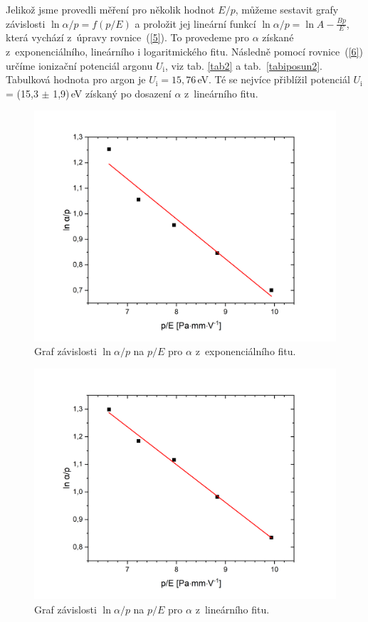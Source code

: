 \documentclass[a4paper,12pt]{article}
\begin{document}
Jelikož jsme provedli měření pro několik hodnot $E/p$, můžeme sestavit grafy 
závislosti $\ln \alpha/p = f(p/E)$ a proložit jej lineární funkcí $\ln \alpha/p 
= \ln A - \frac{Bp}{E}$, která vychází z~úpravy rovnice~(\ref{5}). To provedeme pro $\alpha$ získané z~exponenciálního, lineárního i logaritmického fitu. Následně pomocí rovnice~(\ref{6}) určíme ionizační potenciál 
argonu $U_\text{i}$, viz tab. \ref{tab2} a tab.~\ref{tabiposun2}. Tabulková hodnota pro argon je $U_\text{i} = 
15,76$\,eV. Té se nejvíce přiblížil potenciál $U_\text{i}$ = (15,3 $\pm$  1,9)\,eV 
získaný po 
dosazení $\alpha$ z~lineárního fitu.
 
 \begin{figure}[h!]
 	\centering
 	\includegraphics[width=145mm]{exp.png}
 	\caption{Graf závislosti $\ln \alpha/p$ na $p/E$ pro $\alpha$ 
 	z~exponenciálního fitu.}
 	\label{exp}
 \end{figure}

 \begin{figure}[h!]
	\centering
	\includegraphics[width=145mm]{lin.png}
	\caption{Graf závislosti $\ln \alpha/p$ na $p/E$ pro $\alpha$ z~lineárního 
	fitu.}
	\label{lin}
\end{figure}
\end{document}
